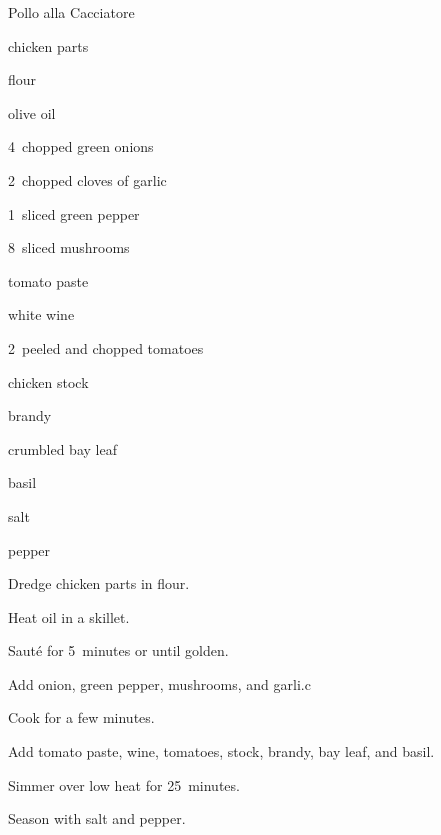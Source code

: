 \begin{recipe}{Pollo alla Cacciatore}{}{}

\begin{ingredients}
\item {} chicken parts
\item \C{\half} flour
\item {} olive oil
\item 4~chopped green onions
\item 2~chopped cloves of garlic
\item 1~sliced green pepper
\item 8~sliced mushrooms
\item {} tomato paste
\item \C{\half} white wine
\item 2~peeled and chopped tomatoes
\item \C{\threequarter} chicken stock
\item \C{\quarter} brandy
\item crumbled bay leaf
\item basil
\item salt
\item pepper
\end{ingredients}

\begin{directions}
\item Dredge chicken parts in flour.
\item Heat oil in a skillet.
\item Saut\'e for 5~minutes or until golden.
\item Add onion, green pepper, mushrooms, and garli.c
\item Cook for a few minutes.
\item Add tomato paste, wine, tomatoes, stock, brandy, bay leaf, and basil.
\item Simmer over low heat for 25~minutes.
\item Season with salt and pepper.
\end{directions}

\end{recipe}
